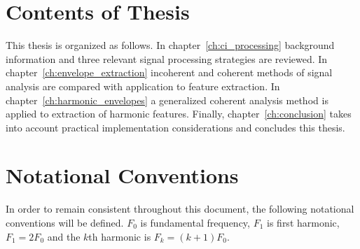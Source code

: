 \documentclass [11pt, proquest,oneside] {ganter_thesis}[2015/03/03]
\begin{document}


\section{Contents of Thesis}

This thesis is organized as follows.  In chapter~\ref{ch:ci_processing} background information and three relevant signal processing strategies are reviewed.  In chapter~\ref{ch:envelope_extraction} incoherent and coherent methods of signal analysis are compared with application to feature extraction.  In chapter~\ref{ch:harmonic_envelopes} a generalized coherent analysis method is applied to extraction of harmonic features.  Finally, chapter~\ref{ch:conclusion} takes into account practical implementation considerations and concludes this thesis.

\section{Notational Conventions}

In order to remain consistent throughout this document, the following notational conventions will be defined.  $F_0$ is fundamental frequency, $F_1$ is first harmonic, $F_1 = 2F_0$ and the $k$th harmonic is $F_k = (k+1)F_0$.
\end{document}
